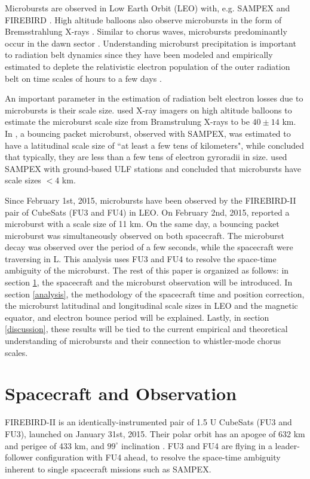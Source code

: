 \documentclass[draft,linenumbers]{agujournal}
\begin{document}
Microbursts are observed in Low Earth Orbit (LEO) with, e.g. SAMPEX \citep{Nakamura95, Nakamura00, Blake96, Lorentzen01a, Lorentzen01b, O'Brien03, O'Brien04, Blum15} and FIREBIRD \citep{Crew16}. High altitude balloons also observe microbursts in the form of Bremsstrahlung X-rays \citep{Parks1967, Woodger15, Anderson2017}. Similar to chorus waves, microbursts predominantly occur in the dawn sector \citep{Lorentzen01b}. Understanding microburst precipitation is important to radiation belt dynamics since they have been modeled and empirically estimated to deplete the relativistic electron population of the outer radiation belt on time scales of hours to a few days \citep{O'Brien04, Thorne05, Shprits07}. 

An important parameter in the estimation of radiation belt electron losses due to microbursts is their scale size. \citet{Parks1967} used X-ray imagers on high altitude balloons to estimate the microburst scale size from Bramstrulung X-rays to be $40 \pm 14$ km. In \citet{Blake96}, a bouncing packet microburst, observed with SAMPEX, was estimated to have a latitudinal scale size of ``at least a few tens of kilometers", while \citet{Blake96} concluded that typically, they are less than a few tens of electron gyroradii in size. \citet{Dietrich10} used SAMPEX with ground-based ULF stations and concluded that microbursts have scale sizes $< 4$ km.

Since February 1st, 2015, microbursts have been observed by the FIREBIRD-II pair of CubeSats (FU3 and FU4) in LEO. On February 2nd, 2015, \citet{Crew16} reported a microburst with a scale size of 11 km. On the same day, a bouncing packet microburst was simultaneously observed on both spacecraft. The microburst decay was observed over the period of a few seconds, while the spacecraft were traversing in L. This analysis uses FU3 and FU4 to resolve the space-time ambiguity of the microburst. The rest of this paper is organized as follows: in section \ref{obs}, the spacecraft and the microburst observation will be introduced. In section \ref{analysis}, the methodology of the spacecraft time and position correction, the microburst latitudinal and longitudinal scale sizes in LEO and the magnetic equator, and electron bounce period will be explained. Lastly, in section \ref{discussion}, these results will be tied to the current empirical and theoretical understanding of microbursts and their connection to whistler-mode chorus scales.

\section{Spacecraft and Observation} \label{obs} %
FIREBIRD-II is an identically-instrumented pair of 1.5 U CubeSats (FU3 and FU3), launched on January 31st, 2015. Their polar orbit has an apogee of 632 km and perigee of 433 km, and $99^{\circ}$ inclination \citep{Crew16}. FU3 and FU4 are flying in a leader-follower configuration with FU4 ahead, to resolve the space-time ambiguity inherent to single spacecraft missions such as SAMPEX.
\end{document}
